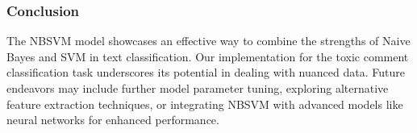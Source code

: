 \subsubsection{Conclusion}
The NBSVM model showcases an effective way to combine the strengths of Naive Bayes and SVM in text classification. Our implementation for the toxic comment classification task underscores its potential in dealing with nuanced data. Future endeavors may include further model parameter tuning, exploring alternative feature extraction techniques, or integrating NBSVM with advanced models like neural networks for enhanced performance.







